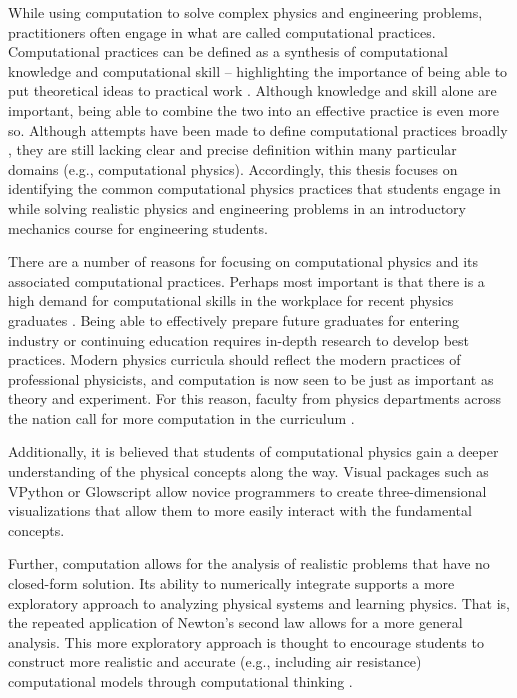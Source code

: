 \documentclass{msuphddissertation}
\begin{document}
\begin{doublespace}
While using computation to solve complex physics and engineering problems, practitioners often engage in what are called computational practices.  Computational practices can be defined as a synthesis of computational knowledge and computational skill -- highlighting the importance of being able to put theoretical ideas to practical work \cite{AAPT2016}.  Although knowledge and skill alone are important, being able to combine the two into an effective practice is even more so.  Although attempts have been made to define computational practices broadly \cite{AAPT2016,NGSS2012,NGSS2013,Weintrop2015}, they are still lacking clear and precise definition within many particular domains (e.g., computational physics).  Accordingly, this thesis focuses on identifying the common computational physics practices that students engage in while solving realistic physics and engineering problems in an introductory mechanics course for engineering students.

There are a number of reasons for focusing on computational physics and its associated computational practices.  Perhaps most important is that there is a high demand for computational skills in the workplace for recent physics graduates \cite{AAPT2016}.  Being able to effectively prepare future graduates for entering industry or continuing education requires in-depth research to develop best practices.  Modern physics curricula should reflect the modern practices of professional physicists, and computation is now seen to be just as important as theory and experiment.  For this reason, faculty from physics departments across the nation call for more computation in the curriculum \cite{Chonacky2008}.

Additionally, it is believed that students of computational physics gain a deeper understanding of the physical concepts \cite{Chabay2008,Kohlmyer2005} along the way.  Visual packages such as VPython or Glowscript \cite{Sherer2000} allow novice programmers to create three-dimensional visualizations that allow them to more easily interact with the fundamental concepts.

Further, computation allows for the analysis of realistic problems that have no closed-form solution.  Its ability to numerically integrate supports a more exploratory approach to analyzing physical systems and learning physics.  That is, the repeated application of Newton's second law allows for a more general analysis.  This more exploratory approach is thought to encourage students to construct more realistic and accurate (e.g., including air resistance) computational models through computational thinking \cite{AAPT2016}.


\end{doublespace}
\end{document}
